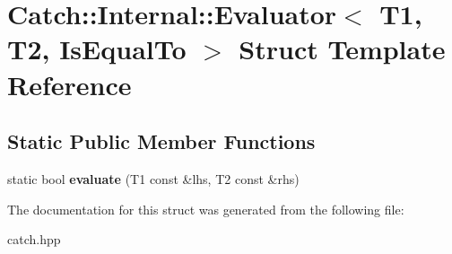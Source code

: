 \hypertarget{structCatch_1_1Internal_1_1Evaluator_3_01T1_00_01T2_00_01IsEqualTo_01_4}{}\section{Catch\+:\+:Internal\+:\+:Evaluator$<$ T1, T2, Is\+Equal\+To $>$ Struct Template Reference}
\label{structCatch_1_1Internal_1_1Evaluator_3_01T1_00_01T2_00_01IsEqualTo_01_4}
\subsection*{Static Public Member Functions}
\begin{DoxyCompactItemize}
\item 
static bool {\bfseries evaluate} (T1 const \&lhs, T2 const \&rhs)\hypertarget{structCatch_1_1Internal_1_1Evaluator_3_01T1_00_01T2_00_01IsEqualTo_01_4_a166b2b7849247397e63fb2940481b217}{}\label{structCatch_1_1Internal_1_1Evaluator_3_01T1_00_01T2_00_01IsEqualTo_01_4_a166b2b7849247397e63fb2940481b217}

\end{DoxyCompactItemize}


The documentation for this struct was generated from the following file\+:\begin{DoxyCompactItemize}
\item 
catch.\+hpp\end{DoxyCompactItemize}
